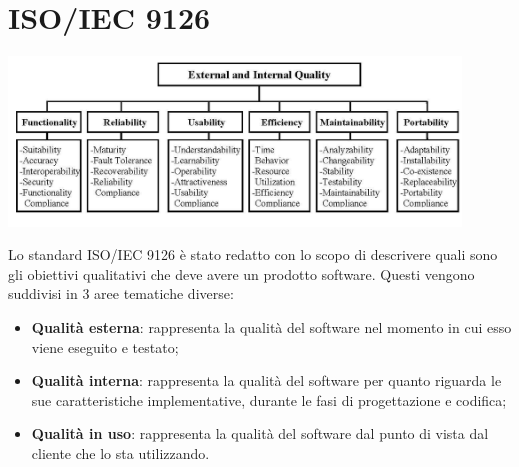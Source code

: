 \newpage
\section{ISO/IEC 9126}

\begin{center}
\includegraphics[keepaspectratio = true, width=12cm]{9126.png}
\end{center}	

Lo standard ISO/IEC 9126 è stato redatto con lo scopo di descrivere quali sono gli obiettivi qualitativi che deve avere un prodotto software. Questi vengono suddivisi in 3 aree tematiche diverse:
\begin{itemize}
\item\textbf{Qualità esterna}: rappresenta la qualità del software nel momento in cui esso viene eseguito e testato;
\item\textbf{Qualità interna}: rappresenta la qualità del software per quanto riguarda le sue caratteristiche implementative, durante le fasi di progettazione e codifica; 
\item\textbf{Qualità in uso}: rappresenta la qualità del software dal punto di vista dal cliente che lo sta utilizzando.
\end{itemize}

